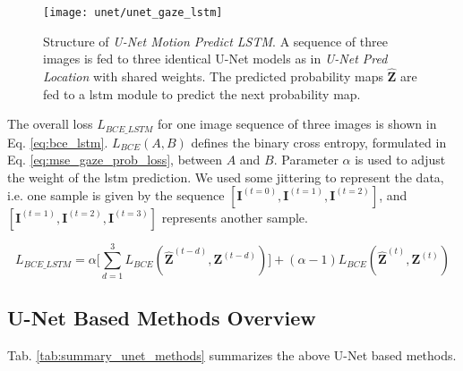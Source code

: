 \endgroup

\begin{figure}[htbp]
  \centering
  \texttt{[image: unet/unet\_gaze\_lstm]}
  \caption[Structure of U-Net Motion Predict LSTM]{Structure of \textit{U-Net Motion Predict LSTM}.
    A sequence of three images is fed to three identical U-Net models as in \textit{U-Net Pred Location} with shared weights.
    The predicted probability maps $\boldsymbol{\hat{Z}}$ are fed to a \gls{lstm} module to predict the next probability map.}
  \label{fig:unet_gaze_lstm}
\end{figure}

The overall loss $L_{BCE\_LSTM}$ for one image sequence of three images is shown in Eq. \ref{eq:bce_lstm}.
$L_{BCE}(A,B)$ defines the binary cross entropy, formulated in Eq. \ref{eq:mse_gaze_prob_loss}, between $A$ and $B$.
Parameter $\alpha$ is used to adjust the weight of the \gls{lstm} prediction.
We used some jittering to represent the data, i.e. one sample is given by the sequence $[\boldsymbol{I}^{(t=0)}, \boldsymbol{I}^{(t=1)}, \boldsymbol{I}^{(t=2)}]$, and $[\boldsymbol{I}^{(t=1)}, \boldsymbol{I}^{(t=2)}, \boldsymbol{I}^{(t=3)}]$ represents another sample.

\begin{equation}
L_{BCE\_LSTM} = \alpha \Big[\sum_{d=1}^3 L_{BCE}(\boldsymbol{\hat{Z}}^{(t-d)}, \boldsymbol{Z}^{(t-d)})\Big] + (\alpha - 1) L_{BCE}(\boldsymbol{\hat{Z}}^{(t)}, \boldsymbol{Z}^{(t)})
\label{eq:bce_lstm}
\end{equation}

\subsection{U-Net Based Methods Overview}
Tab. \ref{tab:summary_unet_methods} summarizes the above U-Net based methods.

